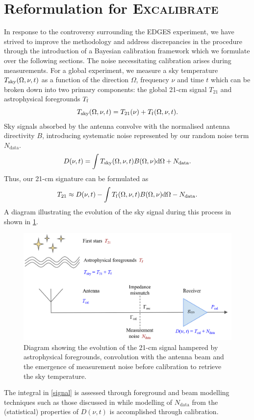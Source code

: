 \section{Reformulation for \textsc{Excalibrate}}\label{sec:reach_formalism}
 In response to the controversy surrounding the EDGES experiment, we have strived to improve the methodology and address discrepancies in the procedure through the introduction of a Bayesian calibration framework which we formulate over the following sections. The noise necessitating calibration arises during measurements. For a global experiment, we measure a sky temperature $T_{\mathrm{sky}}(\Omega, \nu, t)$ as a function of the direction $\Omega$, frequency $\nu$ and time $t$ which can be broken down into two primary components: the global 21-cm signal $T_{21}$ and astrophysical foregrounds $T_{\mathrm{f}}$
\begin{equation}
    \label{tsky}
    T_{\mathrm{sky}}(\Omega, \nu, t) = T_{21}(\nu) + T_{\mathrm{f}}(\Omega, \nu, t).
\end{equation}
Sky signals absorbed by the antenna convolve with the normalised antenna directivity $B$, introducing systematic noise represented by our random noise term $N_{\mathrm{data}}$.
\begin{equation}\label{eqn:bayestsource}
    D(\nu, t) = \int T_{\mathrm{sky}}(\Omega, \nu, t) B(\Omega, \nu)\mathrm{d}\Omega + N_{\mathrm{data}}.
\end{equation}
Thus, our 21-cm signature can be formulated as
\begin{equation}\label{signal}
  T_{21} \approx D(\nu, t) - \int T_{\mathrm{f}}(\Omega, \nu, t)B(\Omega, \nu)\mathrm{d}\Omega - N_{\mathrm{data}}.
\end{equation}
A diagram illustrating the evolution of the sky signal during this process in shown in \cref{fig:nsfig}.
\begin{figure}
    \centering
    \includegraphics[width=.7\textwidth]{nsdiag}
    \caption{Diagram showing the evolution of the 21-cm signal hampered by astrophysical foregrounds, convolution with the antenna beam and the emergence of measurement noise before calibration to retrieve the sky temperature.}
    \label{fig:nsfig}
\end{figure}
The integral in \cref{signal} is assessed through foreground and beam modelling techniques such as those discussed in \citet{dom} while modelling of $N_{\mathrm{data}}$ from the (statistical) properties of $D(\nu, t)$ is accomplished through calibration.

